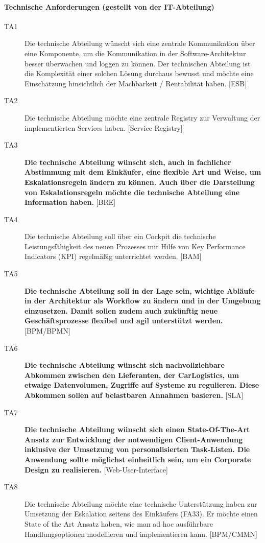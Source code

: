 \paragraph{Technische Anforderungen (gestellt von der IT-Abteilung)}

\begin{description}
  \item[TA1] Die technische Abteilung wünscht sich eine zentrale Kommunikation über eine Komponente, um die Kommunikation in der Software-Architektur besser überwachen und loggen zu können. Der technischen Abteilung ist die Komplexität einer solchen Lösung durchaus bewusst und möchte eine Einschätzung hinsichtlich der Machbarkeit / Rentabilität haben. [ESB]
  \item[TA2] Die technische Abteilung möchte eine zentrale Registry zur Verwaltung der implementierten Services haben. [Service Registry]
  \item[TA3] \textbf{Die technische Abteilung wünscht sich, auch in fachlicher Abstimmung mit dem Einkäufer, eine flexible Art und Weise, um Eskalationsregeln ändern zu können. Auch über die Darstellung von Eskalationsregeln möchte die technische Abteilung eine Information haben.} [BRE]
  \item[TA4] Die technische Abteilung soll über ein Cockpit die technische Leistungsfähigkeit des neuen Prozesses mit Hilfe von Key Performance Indicators (KPI) regelmäßig unterrichtet werden. [BAM]
  \item[TA5] \textbf{Die technische Abteilung soll in der Lage sein, wichtige Abläufe in der Architektur als Workflow zu ändern und in der Umgebung einzusetzen. Damit sollen zudem auch zukünftig neue Geschäftsprozesse flexibel und agil unterstützt werden.} [BPM/BPMN]
  \item[TA6] \textbf{Die technische Abteilung wünscht sich nachvollziehbare Abkommen zwischen den Lieferanten, der CarLogistics, um etwaige Datenvolumen, Zugriffe auf Systeme zu regulieren. Diese Abkommen sollen auf belastbaren Annahmen basieren.} [SLA]
  \item[TA7] \textbf{Die technische Abteilung wünscht sich einen State-Of-The-Art Ansatz zur Entwicklung der notwendigen Client-Anwendung inklusive der Umsetzung von personalisierten Task-Listen. Die Anwendung sollte möglichst einheitlich sein, um ein Corporate Design zu realisieren.} [Web-User-Interface]
  \item[TA8] Die technische Abteilung möchte eine technische Unterstützung haben zur Umsetzung der Eskalation seitens des Einkäufers (FA33). Er möchte einen State of the Art Ansatz haben, wie man ad hoc ausführbare Handlungsoptionen modellieren und implementieren kann. [BPM/CMMN]

\end{description}
